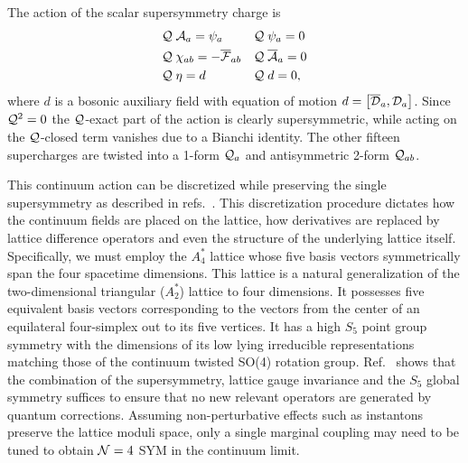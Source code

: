 The action of the scalar supersymmetry charge \cQ is
\begin{align}
  & \mathcal Q\; \mathcal A_a = \psi_a         & & \mathcal Q\; \psi_a = 0 \cr
  & \mathcal Q\; \chi_{ab} = -\overline{\mathcal F}_{ab} & & \mathcal Q\; \overline{\mathcal A}_a = 0 \\
  & \mathcal Q\; \eta = d               & & \mathcal Q\; d = 0,     \nonumber
\end{align}
where $d$ is a bosonic auxiliary field with equation of motion $d = \left[\overline{\mathcal D}_a, \mathcal D_a\right]$.
Since $\mathcal Q^2 = 0$ the $\mathcal Q$-exact part of the action is clearly supersymmetric, while \cQ acting on the $\mathcal Q$-closed term vanishes due to a Bianchi identity.
The other fifteen supercharges are twisted into a 1-form $\mathcal Q_a$ and antisymmetric 2-form $\mathcal Q_{ab}$.

This continuum action can be discretized while preserving the single \cQ supersymmetry as described in refs.~\cite{Kaplan:2005ta, Catterall:2007kn, Damgaard:2008pa, Catterall:2014vka}.
This discretization procedure dictates how the continuum fields are placed on the lattice, how derivatives are replaced by lattice difference operators and even the structure of the underlying lattice itself.
Specifically, we must employ the $A_4^*$ lattice whose five basis vectors symmetrically span the four spacetime dimensions.
This lattice is a natural generalization of the two-dimensional triangular ($A_2^*$) lattice to four dimensions.
It possesses five equivalent basis vectors corresponding to the vectors from the center of an equilateral four-simplex out to its five vertices.
It has a high $S_5$ point group symmetry with the dimensions of its low lying irreducible representations matching those of the continuum twisted SO(4) rotation group.
Ref.~\cite{Catterall:2014mha} shows that the combination of the \cQ supersymmetry, lattice gauge invariance and the $S_5$ global symmetry suffices to ensure that no new relevant operators are generated by quantum corrections.
Assuming non-perturbative effects such as instantons preserve the lattice moduli space, only a single marginal coupling may need to be tuned to obtain $\mathcal N = 4$ SYM in the continuum limit.

